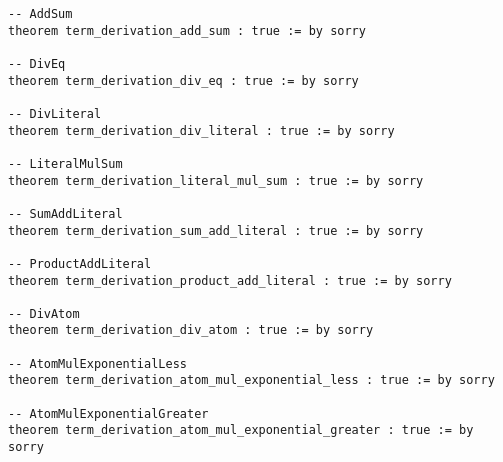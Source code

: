 \documentclass{article}
\begin{document}
\begin{tcolorbox}[colback=white!10, width=\linewidth]
\begin{lstlisting}[language=Lean4]
-- AddSum
theorem term_derivation_add_sum : true := by sorry

-- DivEq
theorem term_derivation_div_eq : true := by sorry

-- DivLiteral
theorem term_derivation_div_literal : true := by sorry

-- LiteralMulSum
theorem term_derivation_literal_mul_sum : true := by sorry

-- SumAddLiteral
theorem term_derivation_sum_add_literal : true := by sorry

-- ProductAddLiteral
theorem term_derivation_product_add_literal : true := by sorry

-- DivAtom
theorem term_derivation_div_atom : true := by sorry

-- AtomMulExponentialLess
theorem term_derivation_atom_mul_exponential_less : true := by sorry

-- AtomMulExponentialGreater
theorem term_derivation_atom_mul_exponential_greater : true := by sorry



\end{lstlisting}
\end{tcolorbox}
\end{document}
